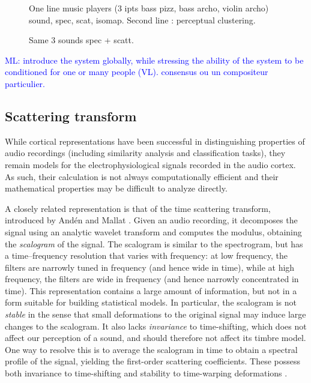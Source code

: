 \documentclass{bmcart}
\newcommand{\ml}[1]{\textcolor{blue}{ML: #1}}
\begin{document}
\begin{figure}[h!]
\caption{
One line music players (3 ipts bass pizz, bass archo, violin archo) sound, spec,
scat, isomap.
Second line : perceptual clustering.}
\label{fig:pipeline}
\end{figure}

\begin{figure}[h!]
\caption{
Same 3 sounds spec + scatt.}
\end{figure}

\ml{introduce the system globally, while stressing the ability of the system to be conditioned for one or many people (VL). consensus ou un compositeur particulier.}

\subsection*{Scattering transform}
\label{sec:scattering}


While cortical representations have been successful in distinguishing properties of audio recordings (including similarity analysis and classification tasks), they remain models for the electrophysiological signals recorded in the audio cortex.
As such, their calculation is not always computationally efficient and their mathematical properties may be difficult to analyze directly.

A closely related representation is that of the time scattering transform, introduced by And\'{e}n and Mallat \cite{anden2011multiscale,anden2014deep}.
Given an audio recording, it decomposes the signal using an analytic wavelet transform and computes the modulus, obtaining the \emph{scalogram} of the signal.
The scalogram is similar to the spectrogram, but has a time--frequency resolution that varies with frequency: at low frequency, the filters are narrowly tuned in frequency (and hence wide in time), while at high frequency, the filters are wide in frequency (and hence narrowly concentrated in time).
This representation contains a large amount of information, but not in a form suitable for building statistical models.
In particular, the scalogram is not \emph{stable} in the sense that small deformations to the original signal may induce large changes to the scalogram.
It also lacks \emph{invariance} to time-shifting, which does not affect our perception of a sound, and should therefore not affect its timbre model.
One way to resolve this is to average the scalogram in time to obtain a spectral profile of the signal, yielding the first-order scattering coefficients.
These possess both invariance to time-shifting and stability to time-warping deformations \cite{anden2014deep}.
\end{document}
